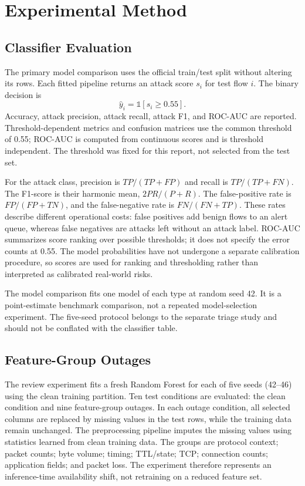 \documentclass[conference]{IEEEtran}
\begin{document}
\section{Experimental Method}
\subsection{Classifier Evaluation}
The primary model comparison uses the official train/test split without altering its rows. Each fitted pipeline returns an attack score $s_i$ for test flow $i$. The binary decision is
\begin{equation}
\hat{y}_i = \mathbb{1}[s_i \geq 0.55].
\end{equation}
Accuracy, attack precision, attack recall, attack F1, and ROC-AUC are reported. Threshold-dependent metrics and confusion matrices use the common threshold of 0.55; ROC-AUC is computed from continuous scores and is threshold independent. The threshold was fixed for this report, not selected from the test set.

For the attack class, precision is $TP/(TP+FP)$ and recall is $TP/(TP+FN)$. The F1-score is their harmonic mean, $2PR/(P+R)$. The false-positive rate is $FP/(FP+TN)$, and the false-negative rate is $FN/(FN+TP)$. These rates describe different operational costs: false positives add benign flows to an alert queue, whereas false negatives are attacks left without an attack label. ROC-AUC summarizes score ranking over possible thresholds; it does not specify the error counts at 0.55. The model probabilities have not undergone a separate calibration procedure, so scores are used for ranking and thresholding rather than interpreted as calibrated real-world risks.

The model comparison fits one model of each type at random seed 42. It is a point-estimate benchmark comparison, not a repeated model-selection experiment. The five-seed protocol belongs to the separate triage study and should not be conflated with the classifier table.

\subsection{Feature-Group Outages}
The review experiment fits a fresh Random Forest for each of five seeds (42--46) using the clean training partition. Ten test conditions are evaluated: the clean condition and nine feature-group outages. In each outage condition, all selected columns are replaced by missing values in the test rows, while the training data remain unchanged. The preprocessing pipeline imputes the missing values using statistics learned from clean training data. The groups are protocol context; packet counts; byte volume; timing; TTL/state; TCP; connection counts; application fields; and packet loss. The experiment therefore represents an inference-time availability shift, not retraining on a reduced feature set.
\end{document}
